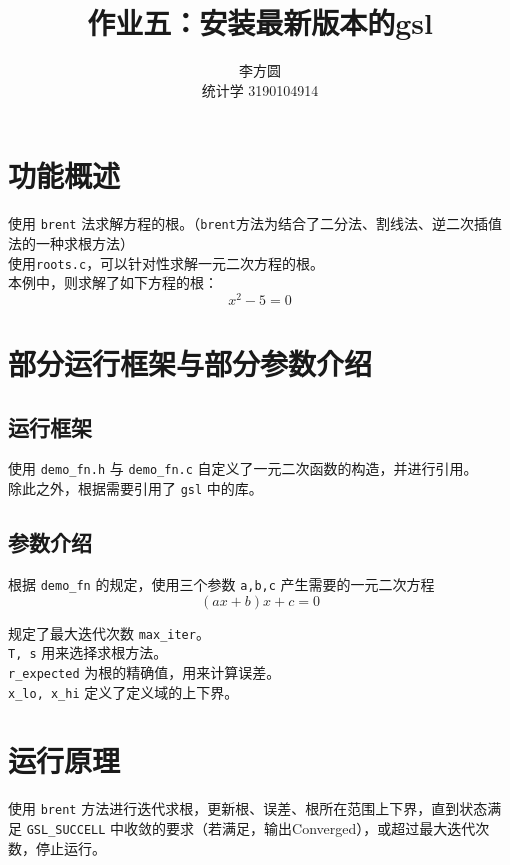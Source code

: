 \documentclass{ctexart}
\title{作业五：安装最新版本的gsl}
\author{李方圆 \\ 统计学  3190104914}
\begin{document}
\maketitle

\section{功能概述}
\noindent 使用 \verb|brent| 法求解方程的根。（\verb|brent|方法为结合了二分法、割线法、逆二次插值法的一种求根方法）\\
使用\verb|roots.c|，可以针对性求解一元二次方程的根。\\
本例中，则求解了如下方程的根：
\begin{equation}
  x^{2}-5=0
\end{equation}
 
\section{部分运行框架与部分参数介绍}
\subsection{运行框架}
\noindent 使用 \verb|demo_fn.h| 与 \verb|demo_fn.c| 自定义了一元二次函数的构造，并进行引用。\\
除此之外，根据需要引用了 \verb|gsl| 中的库。

\subsection{参数介绍}
\noindent 根据 \verb|demo_fn| 的规定，使用三个参数 \verb|a,b,c| 产生需要的一元二次方程
\begin{equation}
  (ax+b)x+c=0
\end{equation}

\noindent 规定了最大迭代次数 \verb|max_iter|。\\
\verb|T, s| 用来选择求根方法。\\
\verb|r_expected| 为根的精确值，用来计算误差。\\
\verb|x_lo, x_hi| 定义了定义域的上下界。

\section{运行原理}

\noindent 使用 \verb|brent| 方法进行迭代求根，更新根、误差、根所在范围上下界，直到状态满足 \verb|GSL_SUCCELL| 中收敛的要求（若满足，输出Converged），或超过最大迭代次数，停止运行。
\end{document}
